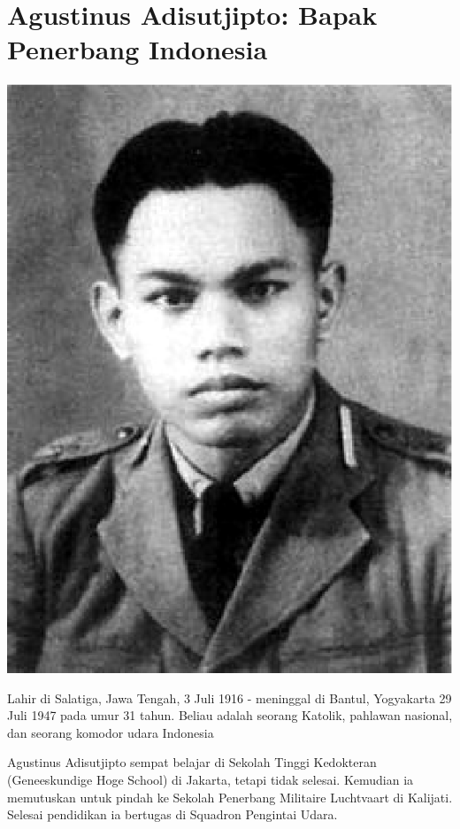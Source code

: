 \newpage
\section*{Agustinus Adisutjipto: Bapak Penerbang Indonesia}

\begin{floatingfigure}[l]{2cm}
\begin{center}
\includegraphics[scale=0.25]{Adisutjipto.ps}
\end{center}
\end{floatingfigure}
Lahir di Salatiga, Jawa Tengah, 3 Juli 1916 - meninggal di Bantul, Yogyakarta 29 Juli 1947 pada umur 31 tahun. Beliau adalah seorang Katolik, pahlawan nasional, dan seorang komodor udara Indonesia

Agustinus Adisutjipto sempat belajar di Sekolah Tinggi Kedokteran (Geneeskundige Hoge School) di Jakarta, tetapi tidak selesai. Kemudian ia memutuskan untuk pindah ke Sekolah Penerbang Militaire Luchtvaart di Kalijati. Selesai pendidikan ia bertugas di Squadron Pengintai Udara.


